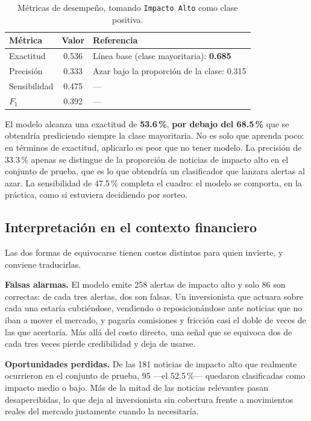 \documentclass[11pt, a4paper]{article}
\begin{document}
\begin{table}[H]
\centering
\caption{Métricas de desempeño, tomando \texttt{Impacto Alto} como clase positiva.}
\label{tab:metricas}
\small
\renewcommand{\arraystretch}{1.15}
\begin{tabular}{l c l}
\toprule
\textbf{Métrica} & \textbf{Valor} & \textbf{Referencia} \\
\midrule
Exactitud     & 0.536 & Línea base (clase mayoritaria): \textbf{0.685} \\
Precisión     & 0.333 & Azar bajo la proporción de la clase: 0.315 \\
Sensibilidad  & 0.475 & --- \\
$F_1$         & 0.392 & --- \\
\bottomrule
\end{tabular}
\end{table}

El modelo alcanza una exactitud de \textbf{53.6\,\%}, \textbf{por debajo del 68.5\,\%} que se
obtendría prediciendo siempre la clase mayoritaria. No es solo que aprenda poco: en términos de
exactitud, aplicarlo es peor que no tener modelo. La precisión de 33.3\,\% apenas se distingue de
la proporción de noticias de impacto alto en el conjunto de prueba, que es lo que obtendría un
clasificador que lanzara alertas al azar. La sensibilidad de 47.5\,\% completa el cuadro: el
modelo se comporta, en la práctica, como si estuviera decidiendo por sorteo.

\subsection{Interpretación en el contexto financiero}

Las dos formas de equivocarse tienen costos distintos para quien invierte, y conviene traducirlas.

\textbf{Falsas alarmas.} El modelo emite 258 alertas de impacto alto y solo 86 son correctas: de
cada tres alertas, dos son falsas. Un inversionista que actuara sobre cada una estaría
cubriéndose, vendiendo o reposicionándose ante noticias que no iban a mover el mercado, y pagaría
comisiones y fricción casi el doble de veces de las que acertaría. Más allá del costo directo, una
señal que se equivoca dos de cada tres veces pierde credibilidad y deja de usarse.

\textbf{Oportunidades perdidas.} De las 181 noticias de impacto alto que realmente ocurrieron en el
conjunto de prueba, 95 —el 52.5\,\%— quedaron clasificadas como impacto medio o bajo. Más de la
mitad de las noticias relevantes pasan desapercibidas, lo que deja al inversionista sin cobertura
frente a movimientos reales del mercado justamente cuando la necesitaría.
\end{document}
